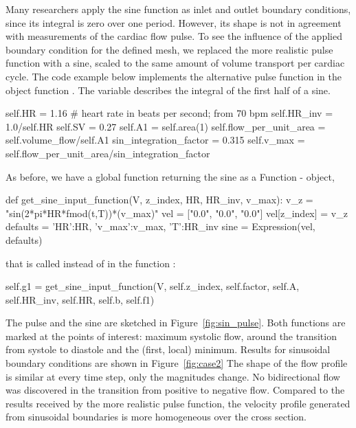 Many researchers apply the sine function as inlet and outlet boundary
conditions, since its integral is zero over one period. However, its
shape is not in agreement with measurements of the cardiac flow
pulse. To see the influence of the applied boundary condition for the
defined mesh, we replaced the more realistic pulse function with a
sine, scaled to the same amount of volume transport per cardiac
cycle. The code example below implements the alternative pulse
function in the object function . The
variable  describes the integral of the
first half of a sine.
\begin{python}
self.HR = 1.16 # heart rate in beats per second; from 70 bpm
self.HR_inv = 1.0/self.HR
self.SV = 0.27
self.A1 = self.area(1)
self.flow_per_unit_area = self.volume_flow/self.A1
sin_integration_factor = 0.315
self.v_max = self.flow_per_unit_area/sin_integration_factor
\end{python}
As before, we have a global function returning the sine as a Function - object,
\begin{python}
def get_sine_input_function(V, z_index, HR, HR_inv, v_max):
        v_z = "sin(2*pi*HR*fmod(t,T))*(v_max)"
        vel = ["0.0", "0.0", "0.0"]
        vel[z_index] = v_z
        defaults = {'HR':HR, 'v_max':v_max, 'T':HR_inv}
        sine = Expression(vel, defaults)
\end{python}
that is called instead of  in the function :
\begin{python}
self.g1 = get_sine_input_function(V, self.z_index, self.factor, self.A, self.HR_inv, self.HR, self.b, self.f1)
\end{python}

The pulse and the sine are sketched in
Figure~\ref{fig:sin_pulse}. Both functions are marked at the points of
interest: maximum systolic flow, around the transition from systole to
diastole and the (first, local) minimum. Results for sinusoidal
boundary conditions are shown in Figure~\ref{fig:case2} The shape of
the flow profile is similar at every time step, only the magnitudes
change. No bidirectional flow was discovered in the transition from
positive to negative flow. Compared to the results received by the
more realistic pulse function, the velocity profile generated from
sinusoidal boundaries is more homogeneous over the cross section.

